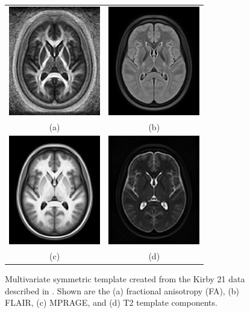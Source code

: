 \documentclass[final,5p,times,twocolumn]{elsarticle}
\begin{document}
\begin{figure}
  \centering
  \begin{tabular}{cc}
    \includegraphics[width=40mm]{Figures/S_templateFA_140.png} &
    \includegraphics[width=40mm]{Figures/S_templateFLAIR_140.png} \\
    (a) & (b) \\
    \includegraphics[width=40mm]{Figures/S_templateT1_140.png} &
    \includegraphics[width=40mm]{Figures/S_templateT2_140.png} \\
    (c) & (d) 
  \end{tabular}
  \caption{Multivariate symmetric template created from the Kirby 
           21 data described in \cite{landman2011}.  Shown are the
           (a) fractional anisotropy (FA), (b) FLAIR, (c) MPRAGE, 
           and (d) T2 template components.
          }
  \label{fig:symmetrictemplates}
\end{figure}
\end{document}
